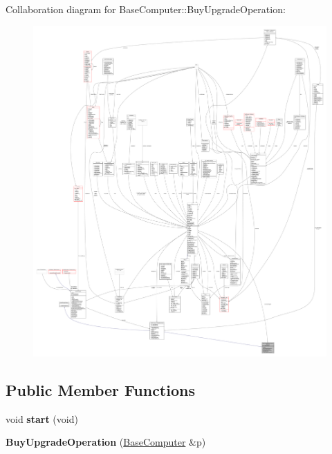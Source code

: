 Collaboration diagram for Base\+Computer\+:\+:Buy\+Upgrade\+Operation\+:
\nopagebreak
\begin{figure}[H]
\begin{center}
\leavevmode
\includegraphics[width=350pt]{dc/d92/classBaseComputer_1_1BuyUpgradeOperation__coll__graph}
\end{center}
\end{figure}
\subsection*{Public Member Functions}
\begin{DoxyCompactItemize}
\item 
void {\bfseries start} (void)\hypertarget{classBaseComputer_1_1BuyUpgradeOperation_ae4c909ef34fd67040dcf5b0af45e0f55}{}\label{classBaseComputer_1_1BuyUpgradeOperation_ae4c909ef34fd67040dcf5b0af45e0f55}

\item 
{\bfseries Buy\+Upgrade\+Operation} (\hyperlink{classBaseComputer}{Base\+Computer} \&p)\hypertarget{classBaseComputer_1_1BuyUpgradeOperation_a7117eedc9e3e185897b2ea7b89776cd0}{}\label{classBaseComputer_1_1BuyUpgradeOperation_a7117eedc9e3e185897b2ea7b89776cd0}

\end{DoxyCompactItemize}
